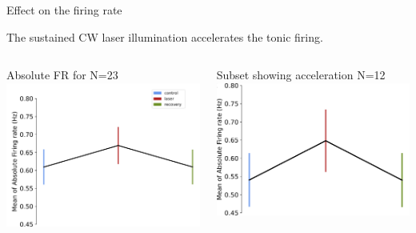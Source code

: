 \documentclass[aspectratio=43]{beamer}
\begin{document}
\begin{frame}{Effect on the firing rate}
	
	\hypertarget{extraFR}{}
	\centering
	
	The sustained CW laser illumination accelerates the tonic firing.
	\begin{columns}
		\begin{column}{0.5\textwidth}
			\normalsize{Absolute FR for N=23}\\
			\hyperlink{FRorg}{
			\includegraphics[width=\textwidth]{Images/frequency-general.pdf}
		}
		\end{column}
		\begin{column}{0.5\textwidth}
		\small{Subset showing acceleration N=12}\\
			\includegraphics[width=\textwidth]{Images/FR_excitation.pdf}

\end{column}
\end{columns}
\end{frame}
\end{document}
